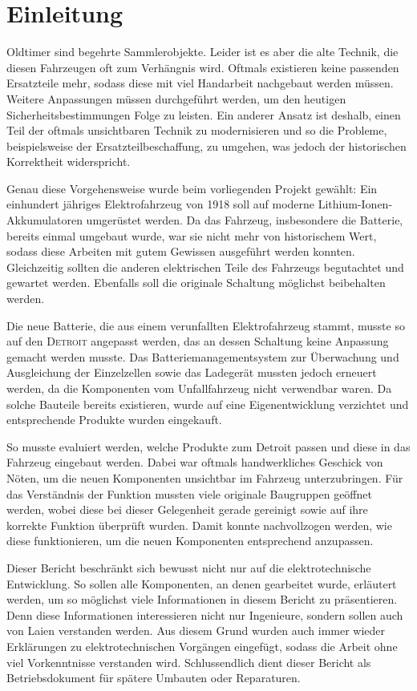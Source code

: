 \chapter{Einleitung}

\color{blue}
Oldtimer sind begehrte Sammlerobjekte. Leider ist es aber die alte Technik, die diesen Fahrzeugen oft zum Verhängnis wird. Oftmals existieren keine passenden Ersatzteile mehr, sodass diese mit viel Handarbeit nachgebaut werden müssen. Weitere Anpassungen müssen durchgeführt werden, um den heutigen Sicherheitsbestimmungen Folge zu leisten. Ein anderer Ansatz ist deshalb, einen Teil der oftmals unsichtbaren Technik zu modernisieren und so die Probleme, beispielsweise der Ersatzteilbeschaffung, zu umgehen, was jedoch der historischen Korrektheit widerspricht.

Genau diese Vorgehensweise wurde beim vorliegenden Projekt gewählt: Ein einhundert jähriges Elektrofahrzeug von 1918 soll auf moderne Lithium-Ionen-Akkumulatoren umgerüstet werden. Da das Fahrzeug, insbesondere die Batterie, bereits einmal umgebaut wurde, war sie nicht mehr von historischem Wert, sodass diese Arbeiten mit gutem Gewissen ausgeführt werden konnten. Gleichzeitig sollten die anderen elektrischen Teile des Fahrzeugs begutachtet und gewartet werden. Ebenfalls soll die originale Schaltung möglichst beibehalten werden.

Die neue Batterie, die aus einem verunfallten Elektrofahrzeug stammt, musste so auf den \textsc{Detroit} angepasst werden, das an dessen Schaltung keine Anpassung gemacht werden musste. Das Batteriemanagementsystem zur Überwachung und Ausgleichung der Einzelzellen sowie das Ladegerät mussten jedoch erneuert werden, da die Komponenten vom Unfallfahrzeug nicht verwendbar waren. Da solche Bauteile bereits existieren, wurde auf eine Eigenentwicklung verzichtet und entsprechende Produkte wurden eingekauft.

So musste evaluiert werden, welche Produkte zum Detroit passen und diese in das Fahrzeug eingebaut werden. Dabei war oftmals handwerkliches Geschick von Nöten, um die neuen Komponenten unsichtbar im Fahrzeug unterzubringen. Für das Verständnis der Funktion mussten
viele originale Baugruppen geöffnet werden, wobei diese bei dieser Gelegenheit gerade gereinigt sowie auf ihre korrekte Funktion überprüft wurden. Damit konnte nachvollzogen werden, wie diese funktionieren, um die neuen Komponenten entsprechend anzupassen.

Dieser Bericht beschränkt sich bewusst nicht nur auf die elektrotechnische Entwicklung. So sollen alle Komponenten, an denen gearbeitet wurde, erläutert werden, um so möglichst viele Informationen in diesem Bericht zu präsentieren. Denn diese Informationen interessieren nicht nur Ingenieure, sondern sollen auch von Laien verstanden werden. Aus diesem Grund wurden auch immer wieder Erklärungen zu elektrotechnischen Vorgängen eingefügt, sodass die Arbeit ohne viel Vorkenntnisse verstanden wird. Schlussendlich dient dieser Bericht als Betriebsdokument für spätere Umbauten oder Reparaturen.
 \color{black}